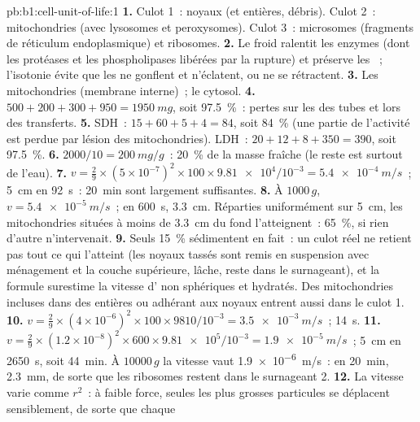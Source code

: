\begin{solution}{pb:b1:cell-unit-of-life:1}
\textbf{1.} Culot 1~: noyaux (et  entières, débris). Culot 2~:
mitochondries (avec lysosomes et peroxysomes). Culot 3~: microsomes
(fragments de réticulum endoplasmique) et ribosomes.
\textbf{2.} Le froid ralentit les enzymes (dont les protéases et les
phospholipases libérées par la rupture) et préserve les ~;
l'isotonie évite que les  ne gonflent et n'éclatent, ou ne se
rétractent.
\textbf{3.} Les mitochondries (membrane interne)~; le cytosol.
\textbf{4.} $500 + 200 + 300 + 950 = \qty{1950}{mg}$, soit
\qty{97.5}{\%}~: pertes sur les  des tubes et lors des transferts.
\textbf{5.} SDH~: $15 + 60 + 5 + 4 = 84$, soit \qty{84}{\%} (une partie
de l'activité est perdue par lésion des mitochondries). LDH~:
$20 + 12 + 8 + 350 = 390$, soit \qty{97.5}{\%}.
\textbf{6.} $2000/10 = \qty{200}{mg/g}$~: \qty{20}{\%} de la masse fraîche (le reste est surtout de l'eau).
\textbf{7.} $v = \frac{2}{9}\times(5\times 10^{-7})^2\times 100\times
\num{9.81e4}/10^{-3} = \qty{5.4e-4}{m/s}$~; \qty{5}{cm} en \qty{92}{s}~:
\qty{20}{min} sont largement suffisantes.
\textbf{8.} À $1000\,g$, $v = \qty{5.4e-5}{m/s}$~; en \qty{600}{s},
\qty{3.3}{cm}. Réparties uniformément sur \qty{5}{cm}, les mitochondries
situées à moins de \qty{3.3}{cm} du fond l'atteignent~: \qty{65}{\%}, si
rien d'autre n'intervenait.
\textbf{9.} Seuls \qty{15}{\%} sédimentent en fait~: un culot réel ne
retient pas tout ce qui l'atteint (les noyaux tassés sont remis en
suspension avec ménagement et la couche supérieure, lâche, reste dans le
surnageant), et la formule surestime la vitesse d' non
sphériques et hydratés. Des mitochondries incluses dans des 
entières ou adhérant aux noyaux entrent aussi dans le culot 1.
\textbf{10.} $v = \frac{2}{9}\times(4\times 10^{-6})^2\times 100\times
9810/10^{-3} = \qty{3.5e-3}{m/s}$~; \qty{14}{s}.
\textbf{11.} $v = \frac{2}{9}\times(1.2\times 10^{-8})^2\times 600\times
\num{9.81e5}/10^{-3} = \qty{1.9e-5}{m/s}$~; \qty{5}{cm} en
\qty{2650}{s}, soit \qty{44}{min}. À $\num{10000}\,g$ la vitesse vaut
\qty{1.9e-6}{m/s}~: en \qty{20}{min}, \qty{2.3}{mm}, de sorte que les
ribosomes restent dans le surnageant 2.
\textbf{12.} La vitesse varie comme $r^2$~: à faible force, seules les
plus grosses particules se déplacent sensiblement, de sorte que chaque

\end{solution}
